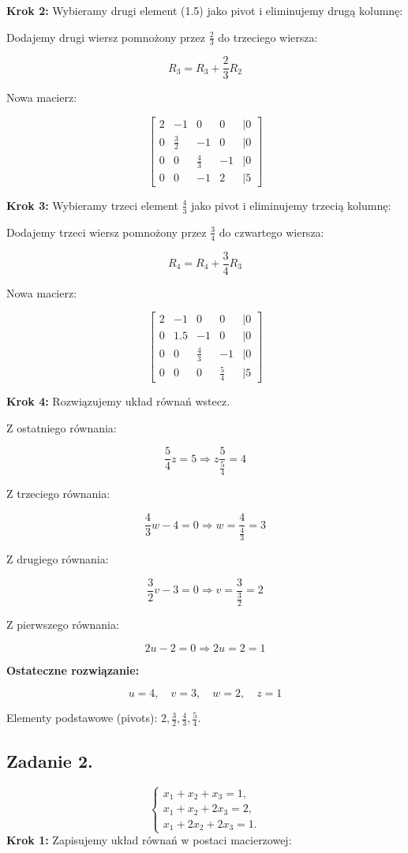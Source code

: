 \documentclass{article}
\begin{document}
\textbf{Krok 2:} Wybieramy drugi element (1.5) jako pivot i eliminujemy drugą kolumnę:

Dodajemy drugi wiersz pomnożony przez \( \frac{2}{3} \) do trzeciego wiersza:

\[
R_3 = R_3 + \frac{2}{3} R_2
\]

Nowa macierz:

\[
\begin{bmatrix}
2 & -1 & 0 & 0 & | 0 \\
0 & \frac{3}{2} & -1 & 0 & | 0 \\
0 & 0 & \frac{4}{3} & -1 & | 0 \\
0 & 0 & -1 & 2 & | 5
\end{bmatrix}
\]

\textbf{Krok 3:} Wybieramy trzeci element \( \frac{4}{3} \) jako pivot i eliminujemy trzecią kolumnę:

Dodajemy trzeci wiersz pomnożony przez \( \frac{3}{4} \) do czwartego wiersza:

\[
R_4 = R_4 + \frac{3}{4} R_3
\]

Nowa macierz:

\[
\begin{bmatrix}
2 & -1 & 0 & 0 & | 0 \\
0 & 1.5 & -1 & 0 & | 0 \\
0 & 0 & \frac{4}{3} & -1 & | 0 \\
0 & 0 & 0 & \frac{5}{4} & | 5
\end{bmatrix}
\]

\textbf{Krok 4:} Rozwiązujemy układ równań wstecz.

Z ostatniego równania:

\[
\frac{5}{4}z = 5 \Rightarrow z\frac{5}{\frac{5}{4}} = 4
\]

Z trzeciego równania:

\[
\frac{4}{3}w - 4 = 0 \Rightarrow w = \frac{4}{\frac{4}{3}} = 3
\]

Z drugiego równania:

\[
\frac{3}{2}v - 3 = 0 \Rightarrow v = \frac{3}{\frac{3}{2}} = 2
\]

Z pierwszego równania:

\[
2u - 2 = 0 \Rightarrow 2u = 2 = 1
\]

\textbf{Ostateczne rozwiązanie:}

\[
u = 4, \quad v = 3, \quad w = 2, \quad z = 1
\]

Elementy podstawowe (pivots): \( 2, \frac{3}{2}, \frac{4}{3}, \frac{5}{4} \).
\subsection{Zadanie 2.}
\[
\begin{cases}
x_1 + x_2 + x_3 = 1, \\
x_1 + x_2 + 2x_3 = 2, \\
x_1 + 2x_2 + 2x_3 = 1.
\end{cases}
\]
\textbf{Krok 1:} Zapisujemy układ równań w postaci macierzowej:
\end{document}
